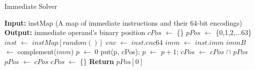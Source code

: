 \begin{algorithm}
    \caption{Immediate Solver} %
      \label{algo:int_solver}
  \begin{algorithmic}[1]
	  \State \textbf{Input:} instMap (A map of immediate instructions and their 64-bit encodings)
      \State \textbf{Output:} immediate operand's binary position
      \State $cPos$ $\gets$ \{\} 
      \State $pPos$ $\gets$ \{0,1,2,...63\} 
      \State $inst$ $\gets$ $instMap[random()]$ 
      \State $enc$ $\gets$ $inst.enc64$ 
      \State $imm$ $\gets$ $inst.imm$ 
      \State $immB$ $\gets$ complement($imm$)
      \State $p$ $\gets$ 0
      \State put(p, cPos); $p$ $\gets$ $p+1$;
      \EndIf
      \EndWhile
      \State $cPos$ $\gets$ $cPos$ $\cap$ $pPos$
      \State $pPos$ $\gets$ $cPos$
      \State $cPos$ $\gets$ \{\}
      \EndWhile
      \State \textbf{Return} $pPos[0]$
  \end{algorithmic}
\end{algorithm}


